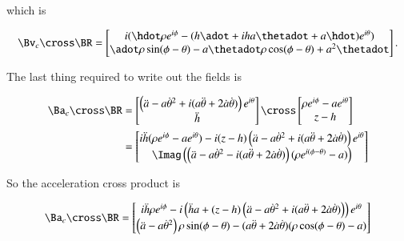 {which is

\begin{equation}\label{eqn:relativisticElectrodynamicsExamReflection:970}
\Bv_c \cross \BR
=
\begin{bmatrix}
i( \hdot \rho e^{i\phi} - (h \adot + i h a \thetadot + a \hdot) e^{i\theta} ) \\
\adot \rho \sin(\phi - \theta) - a \thetadot \rho \cos(\phi - \theta) + a^2 \thetadot
\end{bmatrix}.
\end{equation}

The last thing required to write out the fields is

\begin{equation}\label{eqn:relativisticElectrodynamicsExamReflection:1330}
\begin{aligned}
\Ba_c \cross \BR
&=
\begin{bmatrix}
\left( \ddot{a} - a {\dot{\theta}}^2 + i ( a\ddot{\theta} + 2 \dot{a} \dot{\theta} ) \right) e^{i\theta} \\
\ddot{h}
\end{bmatrix}
\cross
\begin{bmatrix}
\rho e^{i\phi} - a e^{i\theta} \\
z - h
\end{bmatrix} \\
&=
\begin{bmatrix}
i \ddot{h} (\rho e^{i\phi} - a e^{i\theta} ) - i (z - h) \left( \ddot{a} - a {\dot{\theta}}^2 + i ( a\ddot{\theta} + 2 \dot{a} \dot{\theta} ) \right) e^{i\theta} \\
\Imag \left(
\left( \ddot{a} - a {\dot{\theta}}^2 - i ( a\ddot{\theta} + 2 \dot{a} \dot{\theta} ) \right) ( \rho e^{i(\phi -\theta)} - a )
\right)
\end{bmatrix} \\
\end{aligned}
\end{equation}

So the acceleration cross product is

\begin{equation}\label{eqn:relativisticElectrodynamicsExamReflection:980}
\Ba_c \cross \BR
=
\begin{bmatrix}
i \ddot{h} \rho e^{i\phi}
- i \left( \ddot{h} a + (z - h) \left( \ddot{a} - a {\dot{\theta}}^2 + i ( a\ddot{\theta} + 2 \dot{a} \dot{\theta} ) \right) \right) e^{i\theta} \\
\left( \ddot{a} - a {\dot{\theta}}^2 \right) \rho \sin(\phi - \theta)
-( a\ddot{\theta} + 2 \dot{a} \dot{\theta} ) (\rho \cos(\phi -\theta) - a)
\end{bmatrix}
\end{equation}

}
